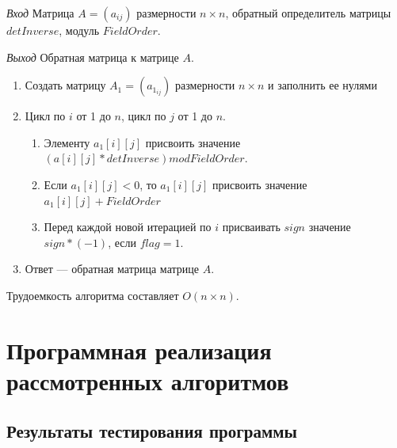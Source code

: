 \documentclass[bachelor, och, labwork]{shiza}
\begin{document}
\textit{Вход} Матрица $A = (a_{ij})$ размерности $n \times n$, обратный определитель
матрицы $detInverse$, модуль $FieldOrder$.

\textit{Выход} Обратная матрица к матрице $A$.

\begin{enumerate}
    \item Создать матрицу $A_1 = (a_{1_{ij}})$ размерности $n \times n$ и заполнить
    ее нулями
    \item Цикл по $i$ от 1 до $n$, цикл по $j$ от 1 до $n$.
        \begin{enumerate}
            \item Элементу $a_1[i][j]$ присвоить значение $(a[i][j] * detInverse) mod FieldOrder$.
            \item Если $a_1[i][j] < 0$, то $a_1[i][j]$ присвоить значение $a_1[i][j] + FieldOrder$
            \item Перед каждой новой итерацией по $i$ присваивать $sign$ значение $sign * (-1)$, 
            если $flag = 1$.
        \end{enumerate}
    \item Ответ --- обратная матрица матрице $A$.
\end{enumerate}

Трудоемкость алгоритма составляет $O(n \times n)$.




\section{Программная реализация рассмотренных алгоритмов}
    
    \subsection{Результаты тестирования программы}
\end{document}
